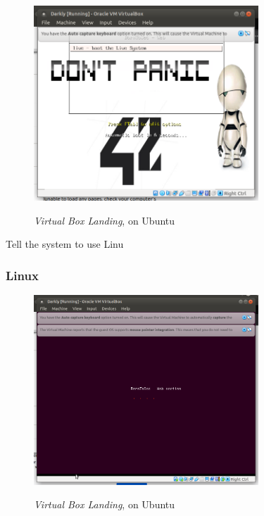 \begin{figure}[!htb]
    \centering
    \includegraphics[width=0.752\textwidth]{images/00-11.png}\\[0cm]  
    \caption[Virtual Box]{\emph{Virtual Box Landing}, on Ubuntu}
    \label{fig:00-11 - Linux Virtual Box Landing} 
\end{figure}

Tell the system to use Linu

\subsubsection{Linux}

\begin{figure}[!htb]
    \centering
    \includegraphics[width=0.752\textwidth]{images/00-12.png}\\[0cm]  
    \caption[Virtual Box]{\emph{Virtual Box Landing}, on Ubuntu}
    \label{fig:00-12 - Linux Virtual Box Landing} 
\end{figure}

